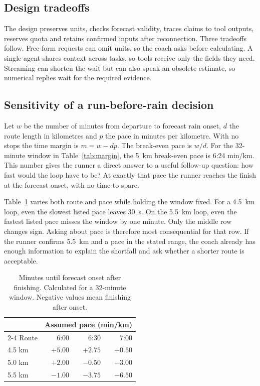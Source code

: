 \documentclass[conference]{IEEEtran}
\begin{document}
\subsection{Design tradeoffs}
The design preserves units, checks forecast validity, traces claims to tool outputs, reserves quota and retains confirmed inputs after reconnection. Three tradeoffs follow. Free-form requests can omit units, so the coach asks before calculating. A single agent shares context across tasks, so tools receive only the fields they need. Streaming can shorten the wait but can also speak an obsolete estimate, so numerical replies wait for the required evidence.

\subsection{Sensitivity of a run-before-rain decision}
Let $w$ be the number of minutes from departure to forecast rain onset, $d$ the route length in kilometres and $p$ the pace in minutes per kilometre. With no stops the time margin is $m=w-dp$. The break-even pace is $w/d$. For the 32-minute window in Table~\ref{tab:margin}, the 5~km break-even pace is 6:24 min/km. This number gives the runner a direct answer to a useful follow-up question: how fast would the loop have to be? At exactly that pace the runner reaches the finish at the forecast onset, with no time to spare.

Table~\ref{tab:grid} varies both route and pace while holding the window fixed. For a 4.5~km loop, even the slowest listed pace leaves 30~s. On the 5.5~km loop, even the fastest listed pace misses the window by one minute. Only the middle row changes sign. Asking about pace is therefore most consequential for that row. If the runner confirms 5.5~km and a pace in the stated range, the coach already has enough information to explain the shortfall and ask whether a shorter route is acceptable.

\begin{table}[tb]
\caption{Minutes until forecast onset after finishing. Calculated for a 32-minute window. Negative values mean finishing after onset.}
\label{tab:grid}\centering\small
\begin{tabular}{@{}lrrr@{}}\toprule
 & \multicolumn{3}{c}{Assumed pace (min/km)}\\
\cmidrule(l){2-4}
Route & 6:00 & 6:30 & 7:00\\\midrule
4.5 km & $+5.00$ & $+2.75$ & $+0.50$\\
5.0 km & $+2.00$ & $-0.50$ & $-3.00$\\
5.5 km & $-1.00$ & $-3.75$ & $-6.50$\\\bottomrule
\end{tabular}
\end{table}
\end{document}
